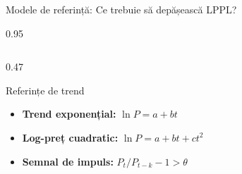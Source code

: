 \documentclass[9pt, aspectratio=169, t]{beamer}
\begin{document}
\begin{frame}{Modele de referință: Ce trebuie să depășească LPPL?}
    \begin{cminipage}{0.95\textwidth}
    {\scriptsize
    \begin{columns}[T]
        \begin{column}{0.47\textwidth}
            \begin{block}{Referințe de trend}
                \begin{itemize}\setlength{\itemsep}{1pt}
                    \item \textbf{Trend exponențial:} $\ln P = a + bt$
                    \item \textbf{Log-preț cuadratic:} $\ln P = a + bt + ct^2$
                    \item \textbf{Semnal de impuls:} $P_t / P_{t-k} - 1 > \theta$
                \end{itemize}
            \end{block}


\end{column}
\end{columns}}
\end{cminipage}
\end{frame}
\end{document}
